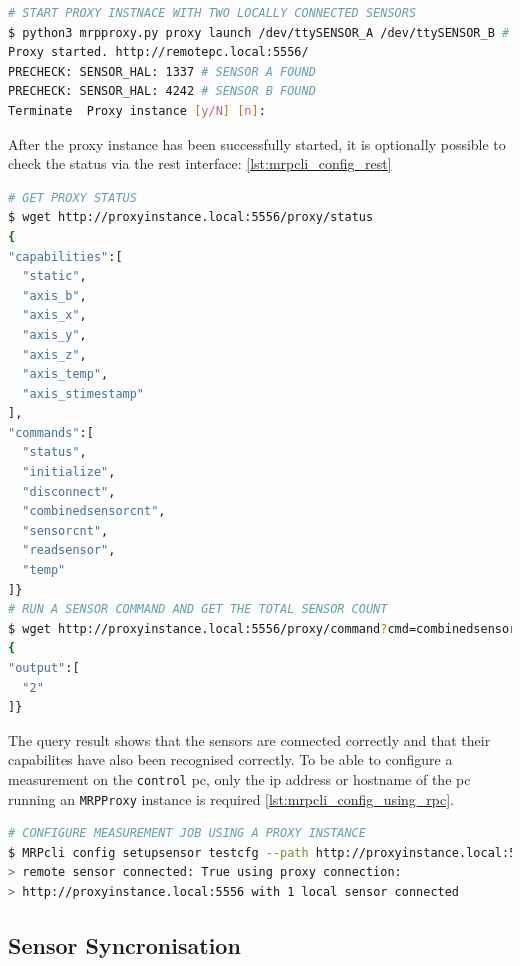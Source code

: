\begin{lstlisting}[language=bash, caption={MRPproxy usage to enable local sensor usage over network}, label=lst:mrpcli_proxy_start]
# START PROXY INSTNACE WITH TWO LOCALLY CONNECTED SENSORS
$ python3 mrpproxy.py proxy launch /dev/ttySENSOR_A /dev/ttySENSOR_B # add another proxy instance http://proxyinstance_2.local for multi-sensor, multi-proxy chain
Proxy started. http://remotepc.local:5556/
PRECHECK: SENSOR_HAL: 1337 # SENSOR A FOUND
PRECHECK: SENSOR_HAL: 4242 # SENSOR B FOUND
Terminate  Proxy instance [y/N] [n]: 
\end{lstlisting}

After the proxy instance has been successfully started, it is optionally
possible to check the status via the \gls{rest} interface:
\ref{lst:mrpcli_config_rest}

\begin{lstlisting}[language=bash, caption={MRPProxy REST endpoint query examples}, label=lst:mrpcli_config_rest]
# GET PROXY STATUS
$ wget http://proxyinstance.local:5556/proxy/status
{
"capabilities":[
  "static",
  "axis_b",
  "axis_x",
  "axis_y",
  "axis_z",
  "axis_temp",
  "axis_stimestamp"
],
"commands":[
  "status",
  "initialize",
  "disconnect",
  "combinedsensorcnt",
  "sensorcnt",
  "readsensor",
  "temp"
]}
# RUN A SENSOR COMMAND AND GET THE TOTAL SENSOR COUNT
$ wget http://proxyinstance.local:5556/proxy/command?cmd=combinedsensorcnt
{
"output":[
  "2"
]}
\end{lstlisting}

The query result shows that the sensors are connected correctly and that
their capabilites have also been recognised correctly. To be able to
configure a measurement on the \passthrough{\lstinline!control!}
\gls{pc}, only the \gls{ip} address or hostname of the \gls{pc} running
an \passthrough{\lstinline!MRPProxy!} instance is required
\ref{lst:mrpcli_config_using_rpc}.

\begin{lstlisting}[language=bash, caption={MRPcli usage example to connect with a network sensor}, label=lst:mrpcli_config_using_rpc]
# CONFIGURE MEASUREMENT JOB USING A PROXY INSTANCE
$ MRPcli config setupsensor testcfg --path http://proxyinstance.local:5556
> remote sensor connected: True using proxy connection:
> http://proxyinstance.local:5556 with 1 local sensor connected
\end{lstlisting}

\hypertarget{sensor-syncronisation}{%
\subsection{Sensor Syncronisation}\label{sensor-syncronisation}}

